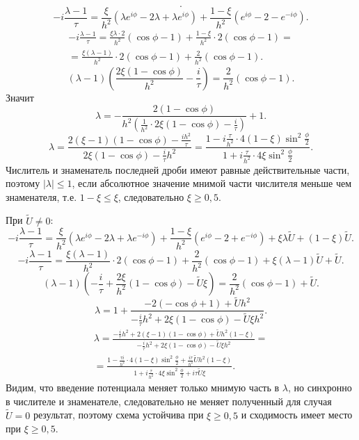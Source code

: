 \documentclass[a4paper]{article}
\begin{document}
\begin{sol}
\[.\] 
\[
-i \frac{\lambda-1}{\tau}=
\frac{\xi}{h^2} \left( 
\lambda e^{i\phi}-2 \lambda+ \lambda e^{i\phi}\right) + \frac{1-\xi}{h^2}
\left( e^{i \phi}-2 -e^{-i\phi} \right) 
.\] 
\begin{multline*}
	-i \frac{\lambda-1}{\tau}= \frac{\xi \lambda \cdot 2}{h^2} \left( \cos \phi-1 \right) 
	+\frac{1-\xi}{h^2}\cdot 2 (\cos \phi-1)=\\=
	\frac{\xi (\lambda-1)}{h^2}\cdot 2(\cos \phi
	-1) + \frac{2}{h^2} (\cos \phi-1)
.\end{multline*} 
\[
	(\lambda-1) \left( 
	\frac{2 \xi (1- \cos \phi)}{h^2}-
\frac{i}{\tau}\right) =
\frac{2}{h^2} (\cos \phi -1)
.\] 
Значит
\[
	\lambda= -\frac{2(1-\cos \phi)}{h^2\left( 
	\frac{1}{h^2}\cdot 2 \xi (1-\cos  \phi) - \frac{i}{\tau}\right) }+1
.\] 
\[
	\lambda= \frac{2 (\xi-1) (1- \cos \phi)-
	\frac{ih^2}{\tau}}{2\xi(1-\cos \phi)-
\frac{i}{\tau}h^2}=
\frac{1- i \frac{\tau}{h^2}\cdot 4(1-\xi) \sin ^2 \frac{\phi}{2}}{1+ i \frac{\tau}{h^2}\cdot 4
\xi \sin ^2 \frac{\phi}{2}}
.\] 
Числитель и знаменатель последней дроби имеют равные
действительные части, поэтому $|\lambda|\le 1$, если
абсолютное значение мнимой части числителя меньше
чем знаменателя, т.\:е. $1-\xi\le \xi$, следовательно
$\xi \ge 0,5$.

При $\tilde{U}\neq 0$:
\[
-i \frac{\lambda-1}{\tau}= \frac{\xi}{h^2}
\left( \lambda e^{i \phi}-2 \lambda+\lambda
e^{-i\phi}\right) + \frac{1-\xi}{h^2}
\left( e^{i\phi}-2 + e^{-i\phi} \right) +
\xi \lambda \tilde{U}+ (1-\xi) \tilde{U}
.\] 
\[
	-i \frac{\lambda-1}{\tau}= \frac{\xi (\lambda-1)}{h^2} \cdot 2 \left( 
	\cos \phi-1\right) +
	\frac{2}{h^2} \left( \cos \phi-1 \right) 
	+\xi (\lambda-1) \tilde{U}+\tilde{U}
.\] 
\[
	(\lambda-1) \left( 
	-\frac{i}{\tau}+ \frac{2\xi}{h^2}
(1-\cos \phi)- \tilde{U} \xi\right) =
\frac{2}{h^2}(\cos \phi-1) +\tilde{U}
.\] 
\[
	\lambda= 1+ \frac{-2 (-\cos \phi+1)+
	\tilde{U} h^2}{- \frac{i}{\tau}h^2+
2 \xi(1-\cos \phi)-\tilde{U} \xi h^2}
.\]
\begin{multline*}
\lambda= \frac{-\frac{i}{\tau}h^2+
2 (\xi-1) (1-\cos \phi) + \tilde{U}h^2(1-\xi)}{
-\frac{i}{\tau}h^2 +2 \xi (1-\cos \phi)-
\tilde{U}\xi h^2}=\\=
\frac{1- \frac{\tau i}{h^2}\cdot 4(1-\xi) \sin ^2
\frac{\phi}{2}+ \frac{i \tau}{h^2}\tilde{U}h^2 (1-\xi)}{1+ i \frac{\tau}{h^2}\cdot 4 \xi \sin ^2 \frac{\phi}{2}+ i \tau  \tilde{U} \xi}
.\end{multline*} 
Видим, что  введение потенциала меняет
только мнимую часть  в $\lambda$,  но
синхронно в числителе и знаменателе, следовательно
не меняет  полученный  для случая $\tilde{U}=0$ 
результат, поэтому  схема устойчива при 
$\xi\ge 0,5$ и сходимость имеет место  при $\xi\ge 0,5$.
\end{sol}
\end{document}
